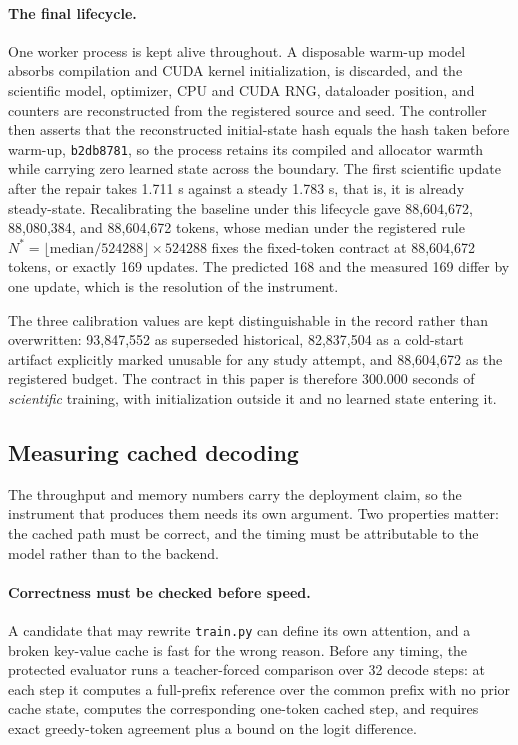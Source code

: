 \documentclass{article}
\begin{document}
\paragraph{The final lifecycle.} One worker process is kept alive throughout. A disposable warm-up model absorbs compilation and CUDA kernel initialization, is discarded, and the scientific model, optimizer, CPU and CUDA RNG, dataloader position, and counters are reconstructed from the registered source and seed. The controller then asserts that the reconstructed initial-state hash equals the hash taken before warm-up, \texttt{b2db8781}, so the process retains its compiled and allocator warmth while carrying zero learned state across the boundary. The first scientific update after the repair takes 1.711 s against a steady 1.783 s, that is, it is already steady-state. Recalibrating the baseline under this lifecycle gave 88,604,672, 88,080,384, and 88,604,672 tokens, whose median under the registered rule $N^{*}=\lfloor \text{median}/524288\rfloor\times524288$ fixes the fixed-token contract at 88,604,672 tokens, or exactly 169 updates. The predicted 168 and the measured 169 differ by one update, which is the resolution of the instrument.

The three calibration values are kept distinguishable in the record rather than overwritten: 93,847,552 as superseded historical, 82,837,504 as a cold-start artifact explicitly marked unusable for any study attempt, and 88,604,672 as the registered budget. The contract in this paper is therefore 300.000 seconds of \emph{scientific} training, with initialization outside it and no learned state entering it.

\subsection{Measuring cached decoding}\label{sec:inference}
The throughput and memory numbers carry the deployment claim, so the instrument that produces them needs its own argument. Two properties matter: the cached path must be correct, and the timing must be attributable to the model rather than to the backend.

\paragraph{Correctness must be checked before speed.} A candidate that may rewrite \texttt{train.py} can define its own attention, and a broken key-value cache is fast for the wrong reason. Before any timing, the protected evaluator runs a teacher-forced comparison over 32 decode steps: at each step it computes a full-prefix reference over the common prefix with no prior cache state, computes the corresponding one-token cached step, and requires exact greedy-token agreement plus a bound on the logit difference.
\end{document}
